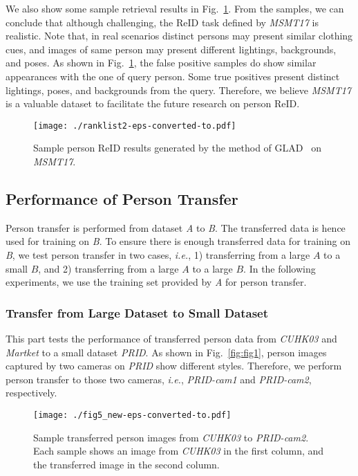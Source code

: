 \documentclass[10pt,twocolumn,letterpaper]{article}
\begin{document}
We also show some sample retrieval results in Fig.~\ref{fig:ranklist}. From the samples, we can conclude that although challenging, the ReID task defined by \emph{MSMT17} is realistic. Note that, in real scenarios distinct persons may present similar clothing cues, and images of same person may present different lightings, backgrounds, and poses. As shown in Fig.~\ref{fig:ranklist}, the false positive samples do show similar appearances with the one of query person. Some true positives present distinct lightings, poses, and backgrounds from the query. Therefore, we believe \emph{MSMT17} is a valuable dataset to facilitate the future research on person ReID.

\begin{figure}
\begin{center}
\texttt{[image: ./ranklist2-eps-converted-to.pdf]}
\end{center}
\caption{Sample person ReID results generated by the method of GLAD~\cite{wei2017glad} on \emph{MSMT17}.}
\label{fig:ranklist}
\end{figure}

\subsection{Performance of Person Transfer}  \label{sec:exp_ptgan}
Person transfer is performed from dataset \emph{A} to \emph{B}. The transferred data is hence used for training on \emph{B}. To ensure there is enough transferred data for training on \emph{B}, we test person transfer in two cases, \emph{i.e.}, 1) transferring from a large $A$ to a small $B$, and 2) transferring from a large $A$ to a large $B$. In the following experiments, we use the training set provided by \emph{A} for person transfer.

\subsubsection{Transfer from Large Dataset to Small Dataset}
\label{sec:BigToSmall}

This part tests the performance of transferred person data from \emph{CUHK03} and \emph{Martket} to a small dataset \emph{PRID}. As shown in Fig.~\ref{fig:fig1}, person images captured by two cameras on \emph{PRID} show different styles. Therefore, we perform person transfer to those two cameras, \emph{i.e.}, \emph{PRID-cam1} and \emph{PRID-cam2}, respectively.

\begin{figure}
\begin{center}
\texttt{[image: ./fig5\_new-eps-converted-to.pdf]}
\end{center}
\caption{Sample transferred person images from \emph{CUHK03} to \emph{PRID-cam2}. Each sample shows an image from \emph{CUHK03} in the first column, and the transferred image in the second column. }
\label{fig:fig5}
\end{figure}
\end{document}
